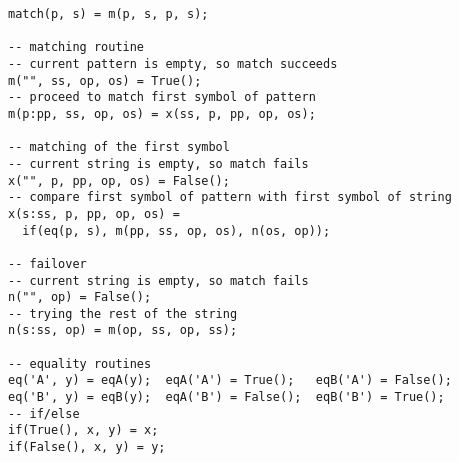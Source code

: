 \begin{lstlisting}[language=sll]
match(p, s) = m(p, s, p, s);

-- matching routine
-- current pattern is empty, so match succeeds
m("", ss, op, os) = True();
-- proceed to match first symbol of pattern
m(p:pp, ss, op, os) = x(ss, p, pp, op, os);

-- matching of the first symbol
-- current string is empty, so match fails
x("", p, pp, op, os) = False();
-- compare first symbol of pattern with first symbol of string
x(s:ss, p, pp, op, os) =
  if(eq(p, s), m(pp, ss, op, os), n(os, op));

-- failover
-- current string is empty, so match fails
n("", op) = False();
-- trying the rest of the string
n(s:ss, op) = m(op, ss, op, ss);

-- equality routines
eq('A', y) = eqA(y);  eqA('A') = True();   eqB('A') = False();
eq('B', y) = eqB(y);  eqA('B') = False();  eqB('B') = True();
-- if/else
if(True(), x, y) = x;
if(False(), x, y) = y;
\end{lstlisting}